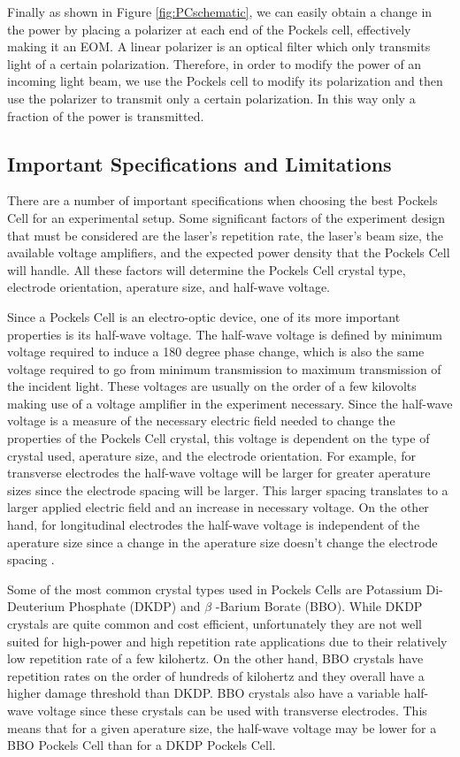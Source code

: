 \documentclass[pdftex,12pt,a4paper]{article}
\begin{document}
Finally as shown in Figure \ref{fig:PCschematic}, we can easily obtain a change in the power by placing a polarizer at each end of the Pockels cell, effectively making it an EOM. A linear polarizer is an optical filter which only transmits light of a certain polarization. Therefore, in order to modify the power of an incoming light beam, we use the Pockels cell to modify its polarization and then use the polarizer to transmit only a certain polarization. In this way only a fraction of the power is transmitted\cite{RP_EOM}.     

\subsection{Important Specifications and Limitations}

There are a number of important specifications when choosing the best Pockels Cell for an experimental setup. Some significant factors of the experiment design that must be considered are the laser's repetition rate, the laser's beam size, the available voltage amplifiers, and the expected power density that the Pockels Cell will handle. All these factors will determine the Pockels Cell crystal type, electrode orientation, aperature size, and half-wave voltage.

Since a Pockels Cell is an electro-optic device, one of its more important properties is its half-wave voltage. The half-wave voltage is defined by minimum voltage required to induce a 180 degree phase change, which is also the same voltage required to go from minimum transmission to maximum transmission of the incident light\cite{RP_Pockels_Cell}. These voltages are usually on the order of a few kilovolts making use of a voltage amplifier in the experiment necessary. Since the half-wave voltage is a measure of the necessary electric field needed to change the properties of the Pockels Cell crystal, this voltage is dependent on the type of crystal used, aperature size, and the electrode orientation. For example, for transverse electrodes the half-wave voltage will be larger for greater aperature sizes since the electrode spacing will be larger. This larger spacing translates to a larger applied electric field and an increase in necessary voltage. On the other hand, for longitudinal electrodes the half-wave voltage is independent of the aperature size since a change in the aperature size doesn't change the electrode spacing \cite{RP_Pockels_Cell}.

Some of the most common crystal types used in Pockels Cells are Potassium Di-Deuterium Phosphate (DKDP) and $\beta$ -Barium Borate (BBO). While DKDP crystals are quite common and cost efficient, unfortunately they are not well suited for high-power and high repetition rate applications due to their relatively low repetition rate of a few kilohertz. On the other hand, BBO crystals have repetition rates on the order of  hundreds of kilohertz and they overall have a higher damage threshold than DKDP. BBO crystals also have a variable half-wave voltage since these crystals can be used with transverse electrodes. This means that for a given aperature size, the half-wave voltage may be lower for a BBO Pockels Cell than for a DKDP Pockels Cell\cite{United_Crystals}.
\end{document}
